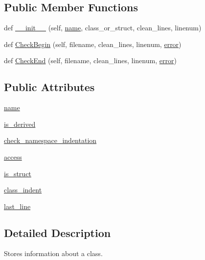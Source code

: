 \subsection*{Public Member Functions}
\begin{DoxyCompactItemize}
\item 
def \hyperlink{classcpplint_1_1___class_info_a549b13e77acbe712f79a2d2b2c98ff7d}{\+\_\+\+\_\+init\+\_\+\+\_\+} (self, \hyperlink{classcpplint_1_1___class_info_a3de5f207d3449d735d15ebca779fe336}{name}, class\+\_\+or\+\_\+struct, clean\+\_\+lines, linenum)
\item 
def \hyperlink{classcpplint_1_1___class_info_abed47237f2e7416ca51cb220cfad6c1b}{Check\+Begin} (self, filename, clean\+\_\+lines, linenum, \hyperlink{_07copy_08_2_read_camera_model_8m_ac546fdc9911f4a876dbfaffbc7426f8b}{error})
\item 
def \hyperlink{classcpplint_1_1___class_info_a8a61461a72928bc6ce62a9b75b770fec}{Check\+End} (self, filename, clean\+\_\+lines, linenum, \hyperlink{_07copy_08_2_read_camera_model_8m_ac546fdc9911f4a876dbfaffbc7426f8b}{error})
\end{DoxyCompactItemize}
\subsection*{Public Attributes}
\begin{DoxyCompactItemize}
\item 
\hyperlink{classcpplint_1_1___class_info_a3de5f207d3449d735d15ebca779fe336}{name}
\item 
\hyperlink{classcpplint_1_1___class_info_a8cace481686fbbb35a1da552646aa9f4}{is\+\_\+derived}
\item 
\hyperlink{classcpplint_1_1___class_info_a0ead95c17ac0b293d0d371eb7b414bd9}{check\+\_\+namespace\+\_\+indentation}
\item 
\hyperlink{classcpplint_1_1___class_info_aef1251c699b50c6603ce38ca8cce414c}{access}
\item 
\hyperlink{classcpplint_1_1___class_info_a57b443f42838d73183921d661b6fe4ef}{is\+\_\+struct}
\item 
\hyperlink{classcpplint_1_1___class_info_adc7d328734cc58fe46a3a3f323a09f4a}{class\+\_\+indent}
\item 
\hyperlink{classcpplint_1_1___class_info_a72e0f4576cdcb6f3886ed52e2affbc75}{last\+\_\+line}
\end{DoxyCompactItemize}


\subsection{Detailed Description}
\begin{DoxyVerb}Stores information about a class.\end{DoxyVerb}
 

